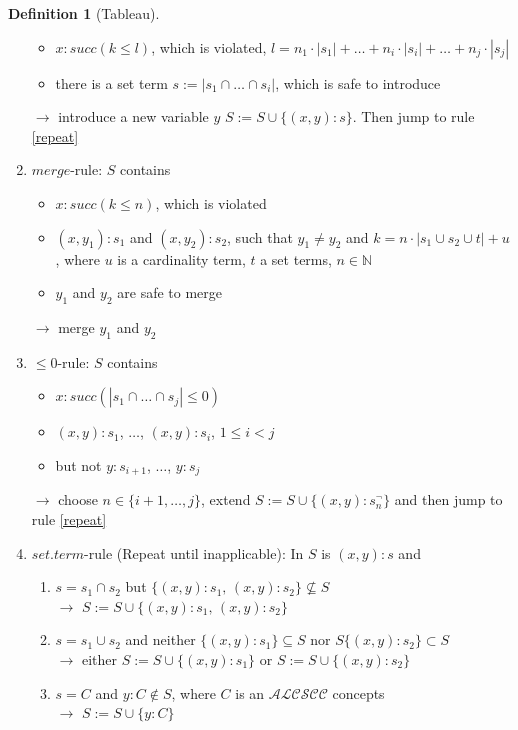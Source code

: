 \documentclass[a4paper,11pt]{scrartcl}
\theoremstyle{break}
\theoremstyle{definition}
\newtheorem{mydef}{Definition}
\begin{document}
\begin{mydef}[Tableau]
\begin{enumerate}
\begin{itemize}
\item $x:succ(k\leq l)$, which is violated, $l=n_1\cdot|s_1|+\dots+n_i\cdot|s_i|+\dots+n_j\cdot|s_j|$
\item there is a set term $s:=|s_1\cap \dots \cap s_i|$, which is safe to introduce
\end{itemize}
$\rightarrow$ introduce a new variable $y$ $S:=S\cup\{(x,y):s\}$. Then jump to rule \ref{repeat}
\item\label{exceeded}$merge$-rule: $S$ contains
\begin{itemize}
\item $x:succ(k\leq n)$, which is violated
\item $(x,y_1):s_1$ and $(x,y_2):s_2$, such that $y_1\neq y_2$ and $k=n\cdot|s_1\cup s_2\cup t|+u$, where $u$ is a cardinality term, $t$ a set terms, $n\in\mathbb{N}$
\item $y_1$ and $y_2$ are safe to merge
\end{itemize}
$\rightarrow$ merge $y_1$ and $y_2$ 
\item\label{s}$\leq 0$-rule: $S$ contains 
\begin{itemize}
\item $x:succ(|s_1\cap\dots\cap s_j|\leq 0)$
\item $(x,y):s_1$, $\dots$, $(x,y):s_i$, $1\leq i<j$
\item but not $y:s_{i+1}$, $\dots$, $y:s_j$
\end{itemize}
$\rightarrow$ choose $n\in\{i+1,\dots, j\}$, extend $S:=S\cup\{(x,y):s_n^\neg\}$ and then jump to rule \ref{repeat}
\item\label{repeat} $set.term$-rule (Repeat until inapplicable): In $S$ is $(x,y):s$ and
\begin{enumerate}
\item\label{setterm1} $s=s_1\cap s_2$ but $\{(x,y):s_1,\,(x,y):s_2\}\not\subseteq S$\\
$\rightarrow$ $S:=S\cup \{(x,y):s_1,\,(x,y):s_2\}$ 
\item\label{setterm2} $s=s_1\cup s_2$ and neither $\{(x,y):s_1\}\subseteq S$ nor $S\{(x,y):s_2\}\subset S$\\
$\rightarrow$ either $S:=S\cup \{(x,y):s_1\}$ or $S:=S\cup \{(x,y):s_2\}$ 
\item\label{setterm3} $s=C$ and $y:C\notin S$, where $C$ is an $\mathcal{ALCSCC}$ concepts\\
$\rightarrow$ $S:=S\cup\{y:C\}$
\end{enumerate}
\end{enumerate}
\end{mydef}
\end{document}
